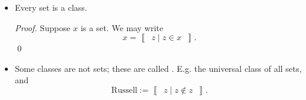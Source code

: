 \documentclass[notoc,notitlepage]{tufte-book}
\newcommand{\class}[1]{\left\llbracket \enspace #1 \enspace \right\rrbracket}
\begin{document}
\begin{note}
  \begin{itemize}
    \item Every set is a class.
      \begin{proof}
        Suppose $x$ is a set. We may write
        \begin{equation*}
          x = \class{ z \mid z \in x }.
        \end{equation*}\qed
      \end{proof}

    \item Some classes are not sets; these are called . E.g. the universal class of all sets, and
      \begin{equation*}
        \text{Russell} := \class{ z \mid z \notin z }.
      \end{equation*}
  \end{itemize}
\end{note}




\appendix

\backmatter

\pagestyle{plain}

\nobibliography*
% 

\printindex
\end{document}
